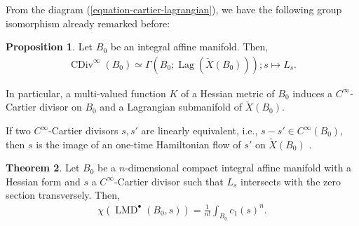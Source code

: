 \documentclass[a4paper,dvipdfmx,reqno,12pt]{amsart}
\theoremstyle{definition}
\newtheorem{theorem}{Theorem}[section]
\newtheorem{proposition}[theorem]{Proposition}
\newcommand{\opn}[1]{\operatorname{#1}}
\numberwithin{equation}{section}
\begin{document}
From the diagram (\ref{equation-cartier-lagrangian}),
we have the following group isomorphism already remarked 
before:

\begin{proposition}
\label{proposition-cartier-lagrangian}
Let $B_0$ be an integral affine manifold. Then,
\begin{align}
\opn{CDiv}^{\infty}(B_0)\simeq \Gamma(B_0;
\opn{Lag}(\check{X}(B_0)));s\mapsto L_s.
\end{align}
\end{proposition}

In particular, a multi-valued function $K$ of a Hessian 
metric of $B_0$ induces a $C^{\infty}$-Cartier divisor on $B_0$
and a Lagrangian submanifold of $\check{X}(B_0)$.

If two $C^{\infty}$-Cartier divisors $s,s'$ are linearly equivalent, 
i.e., $s-s'\in C^{\infty}(B_0)$, 
then $s$ is the image of an one-time Hamiltonian flow of $s'$
on $\check{X}(B_0)$
\cite[Exercise 6.65]{MR2567952}.


















\begin{theorem} \label{theorem-MRR-hesse}
  Let $B_0$ be a $n$-dimensional compact 
integral affine manifold with a Hessian form and
  $s$ a $C^{\infty}$-Cartier divisor such that $L_s$ intersects 
with the zero section transversely. Then,
  \begin{align} \label{equation-Hesse-RR}
\chi(\opn{LMD}^{\bullet}(B_0,s))=\frac{1}{n!}\int_{B_0}c_1(s)^{n}.
  \end{align}
\end{theorem}
\end{document}
